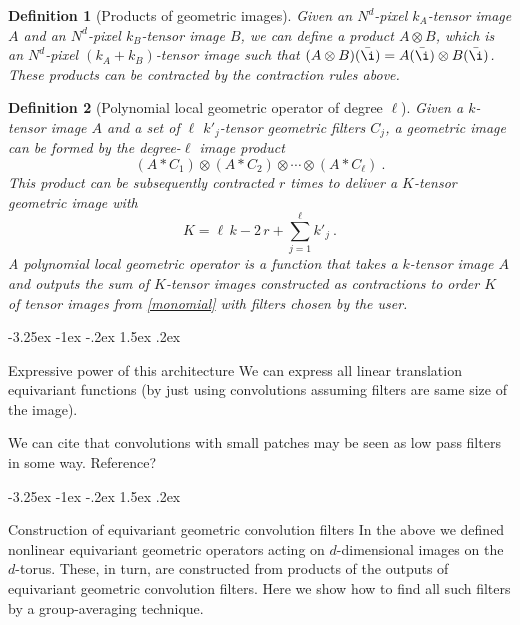 \documentclass{article}
\makeatletter
\theoremstyle{plain}
\newtheorem{definition}{Definition}
\renewcommand\section{\@startsection {section}{1}{\z@}%
  {-3.25ex \@plus -1ex \@minus -.2ex}%
  {1.5ex \@plus .2ex}%
  {\raggedright\normalfont\large\bfseries}}
\makeatother
\begin{document}
\begin{definition}[Products of geometric images]
Given an $N^d$-pixel $k_A$-tensor image $A$ and an $N^d$-pixel $k_B$-tensor image $B$, we can define a product $A\otimes B$, which is an $N^d$-pixel $(k_A+k_B)$-tensor image such that $(A\otimes B)(\bar\i)=A(\bar\i)\otimes B(\bar\i)$. These products can be contracted by the contraction rules above.
\end{definition}

\begin{definition}[Polynomial local geometric operator of degree $\ell$]
Given a $k$-tensor image $A$ and a set of $\ell$ $k'_j$-tensor geometric filters $C_j$, a geometric image can be formed by the degree-$\ell$ image product
\begin{equation}
    (A\ast C_1) \otimes (A\ast C_2) \otimes \cdots \otimes (A\ast C_\ell) ~. \label{monomial}
\end{equation}
This product can be subsequently contracted $r$ times to deliver a $K$-tensor geometric image with
\begin{equation}
    K = \ell\,k - 2\,r + \sum_{j=1}^\ell k'_j ~.
\end{equation}
A polynomial local geometric operator is a function that takes a $k$-tensor image $A$ and outputs the sum of $K$-tensor images constructed as contractions to order $K$ of tensor images from \eqref{monomial} with filters chosen by the user. 
\end{definition}

\section{Expressive power of this architecture}
We can express all linear translation equivariant functions (by just using convolutions assuming filters are same size of the image). 

We can cite that convolutions with small patches may be seen as low pass filters in some way. Reference?



\section{Construction of equivariant geometric convolution filters}
In the above we defined nonlinear equivariant geometric operators acting on $d$-dimensional images on the $d$-torus.
These, in turn, are constructed from products of the outputs of equivariant geometric convolution filters.
Here we show how to find all such filters by a group-averaging technique.
\end{document}
